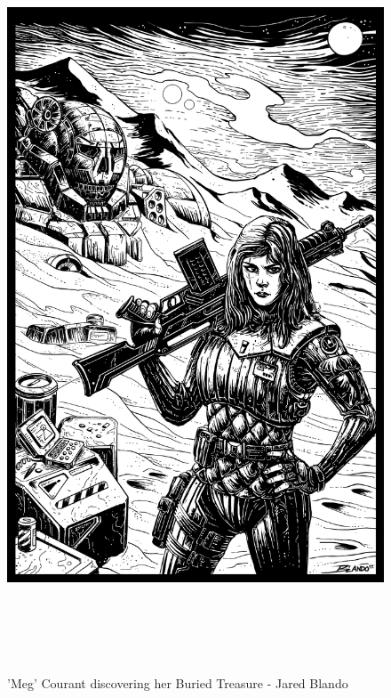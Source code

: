 \begin{figure}[!h]
  \centering
  \includegraphics[alt='MechWarrior finding buried Atlas', width=5.5in, height=8.5in]{img/Buried-Treasure.png}
  \caption*{'Meg' Courant discovering her Buried Treasure - Jared Blando}
\end{figure}
